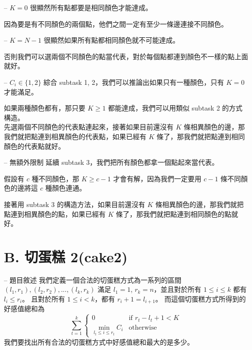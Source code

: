 \documentclass[hyperref,UTF8,notheorems,xcolor={dvipsnames}]{beamer}
\newcommand{\btitle}[1]{{\secname} -- #1}
\theoremstyle{definition}
\begin{document}
\begin{frame}[fragile]{\btitle{$K = 0$}}
	很顯然所有點都要是相同顏色才能達成。 

	因為要是有不同顏色的兩個點，他們之間一定有至少一條邊連接不同顏色。
\end{frame}

\begin{frame}[fragile]{\btitle{$K = N - 1$}}
	很顯然如果所有點都相同顏色就不可能達成。 

	否則我們可以選兩個不同顏色的點當代表，對於每個點都連到顏色不一樣的點上面就好。
\end{frame}

\begin{frame}[fragile]{\btitle{$C_i \in \{1, 2\}$}}
	綜合 subtask 1, 2，我們可以推論出如果只有一種顏色，只有 $K = 0$ 才能滿足。
	\pause

	如果兩種顏色都有，那只要 $K \ge 1$ 都能達成，我們可以用類似 subtask 2 的方式構造。 \\
	先選兩個不同顏色的代表點連起來，接著如果目前還沒有 $K$ 條相異顏色的邊，那我們就把點連到相異顏色的代表點，如果已經有 $K$ 條了，那我們就把點連到相同顏色的代表點就好。
\end{frame}

\begin{frame}[fragile]{\btitle{無額外限制}}
	延續 subtask 3，我們把所有顏色都拿一個點起來當代表。 
	\pause

	假設有 $c$ 種不同顏色，那 $K \ge c - 1$ 才會有解，因為我們一定要用 $c - 1$ 條不同顏色的邊將這 $c$ 種顏色連通。
	\pause

	接著用 subtask 3 的構造方法，如果目前還沒有 $K$ 條相異顏色的邊，那我們就把點連到相異顏色的點，如果已經有 $K$ 條了，那我們就把點連到相同顏色的點就好。
\end{frame}

\section{B. 切蛋糕 2(cake2)}

\begin{frame}[fragile]{\btitle{題目敘述}}
	我們定義一個合法的切蛋糕方式為一系列的區間 $(l_1, r_1), (l_2, r_2), ..., (l_k, r_k)$
	滿足 $l_1 = 1$, $r_k = n$，並且對於所有 $1 \le i \le k$ 都有 $l_i \le r_i$。
	且對於所有 $1 \le i < k$，都有 $r_i + 1 =  l_{i + 1}$。
	而這個切蛋糕方式所得到的好感值總和為 
	$$
	\sum_{t = 1}^{k} \begin{cases}
	0 & \text{if  } r_t - l_t + 1 < K \\
	\min \limits_{l_t \le i \le r_t} C_i & \text{otherwise  }
	\end{cases}
	$$
	我們要找出所有合法的切蛋糕方式中好感值總和最大的是多少。
\end{frame}
\end{document}
